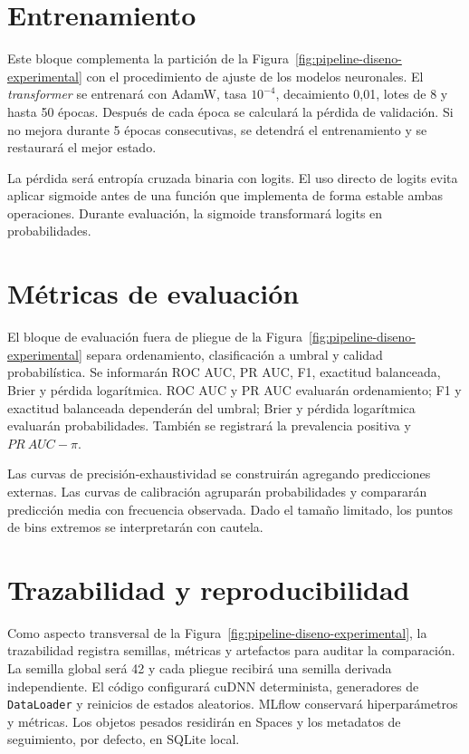\section{Entrenamiento}
\label{sec:entrenamiento}

Este bloque complementa la partición de la Figura~\ref{fig:pipeline-diseno-experimental} con el procedimiento de ajuste de los modelos neuronales. El \textit{transformer} se entrenará con AdamW, tasa $10^{-4}$, decaimiento 0,01, lotes de 8 y hasta 50 épocas. Después de cada época se calculará la pérdida de validación. Si no mejora durante 5 épocas consecutivas, se detendrá el entrenamiento y se restaurará el mejor estado.

La pérdida será entropía cruzada binaria con logits. El uso directo de logits evita aplicar sigmoide antes de una función que implementa de forma estable ambas operaciones. Durante evaluación, la sigmoide transformará logits en probabilidades.

\section{Métricas de evaluación}
\label{sec:metricas_eval}

El bloque de evaluación fuera de pliegue de la Figura~\ref{fig:pipeline-diseno-experimental} separa ordenamiento, clasificación a umbral y calidad probabilística. Se informarán ROC AUC, PR AUC, F1, exactitud balanceada, Brier y pérdida logarítmica. ROC AUC y PR AUC evaluarán ordenamiento; F1 y exactitud balanceada dependerán del umbral; Brier y pérdida logarítmica evaluarán probabilidades. También se registrará la prevalencia positiva y $PR\ AUC-\pi$.

Las curvas de precisión-exhaustividad se construirán agregando predicciones externas. Las curvas de calibración agruparán probabilidades y compararán predicción media con frecuencia observada. Dado el tamaño limitado, los puntos de bins extremos se interpretarán con cautela.

\section{Trazabilidad y reproducibilidad}
\label{sec:trazabilidad}

Como aspecto transversal de la Figura~\ref{fig:pipeline-diseno-experimental}, la trazabilidad registra semillas, métricas y artefactos para auditar la comparación. La semilla global será 42 y cada pliegue recibirá una semilla derivada independiente. El código configurará cuDNN determinista, generadores de \texttt{DataLoader} y reinicios de estados aleatorios. MLflow conservará hiperparámetros y métricas. Los objetos pesados residirán en Spaces y los metadatos de seguimiento, por defecto, en SQLite local.

